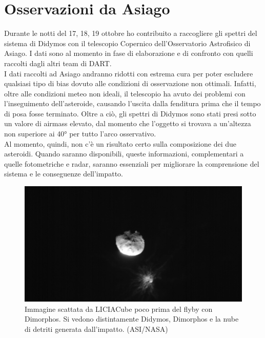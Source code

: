\documentclass[a4paper,11pt,openright]{book}
\begin{document}
\section{Osservazioni da Asiago}
Durante le notti del 17, 18, 19 ottobre ho contribuito a raccogliere gli spettri del sistema di Didymos con il telescopio Copernico dell'Osservatorio Astrofisico di Asiago. I dati sono al momento in fase di elaborazione e di confronto con quelli raccolti dagli altri team di DART.\\
I dati raccolti ad Asiago andranno ridotti con estrema cura per poter escludere qualsiasi tipo di bias dovuto alle condizioni di osservazione non ottimali. Infatti, oltre alle condizioni meteo non ideali, il telescopio ha avuto dei problemi con l'inseguimento dell'asteroide, causando l'uscita dalla fenditura prima che il tempo di posa fosse terminato. Oltre a ciò, gli spettri di Didymos sono stati presi sotto un valore di airmass elevato, dal momento che l'oggetto si trovava a un'altezza non superiore ai 40° per tutto l'arco osservativo.\\
Al momento, quindi, non c'è un risultato certo sulla composizione dei due asteroidi. Quando saranno disponibili, queste informazioni, complementari a quelle fotometriche e radar, saranno essenziali per migliorare la comprensione del sistema e le conseguenze dell'impatto.


\begin{figure}
    \centering
    \includegraphics[width=\textwidth]{figure/liciacube_impact_1.png}
    \caption[Immagine scattata da LICIACube poco prima del flyby con Dimorphos.]{Immagine scattata da LICIACube poco prima del flyby con Dimorphos. Si vedono distintamente Didymos, Dimorphos e la nube di detriti generata dall'impatto. (ASI/NASA)}
    \label{fig:liciacube_impact_1}
\end{figure}
\end{document}
